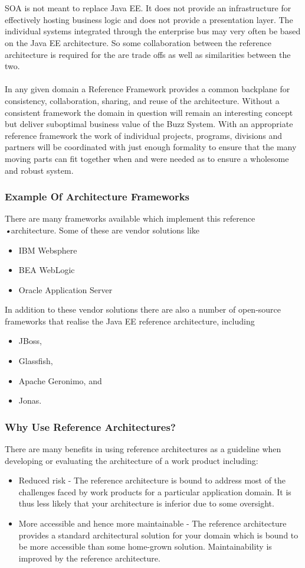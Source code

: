 \documentclass[a4paper]{article}
\begin{document}
\\\\
SOA is not meant to replace Java EE. It does not provide an infrastructure for effectively hosting business logic and does not provide a presentation layer. The individual systems integrated through the enterprise bus may very often be based on the Java EE architecture. So some collaboration between the reference architecture is required for the are trade offs as well as similarities between the two.
\\\\
In any given domain  a Reference Framework  provides a common backplane for consistency, collaboration, sharing, and reuse of the architecture. Without a consistent framework the domain in question will remain an interesting concept but deliver suboptimal business value of the Buzz System. With an appropriate reference framework the work of individual projects, programs, divisions and partners will be coordinated with just enough formality to ensure that the many moving parts can fit together when and were needed as to ensure a wholesome and robust system.


\subsubsection{Example Of Architecture Frameworks}
There are many frameworks available which implement this reference \textsl{\textsl{•}}architecture. Some of these are vendor solutions like
\begin{itemize}
\item IBM Websphere
\item BEA WebLogic
\item Oracle Application Server
\end{itemize} 
In addition to these vendor solutions there are also a number of open-source frameworks that realise the Java EE reference architecture, including
\begin{itemize}
\item JBoss,
\item Glassfish,
\item Apache Geronimo, and
\item Jonas.
\end{itemize}
\subsubsection{Why Use Reference Architectures?}
There are many benefits in using reference architectures as a guideline when developing or evaluating the architecture of a work product including:
\begin{itemize}
\item Reduced risk - The reference architecture is bound to address most of the challenges faced by work products for a particular application domain. It is thus less likely that your architecture is inferior due to some oversight.
\item More accessible and hence more maintainable - The reference architecture provides a standard architectural solution for your domain which is bound to be more accessible than some home-grown solution. Maintainability is improved by the reference architecture.
\end{itemize}
\end{document}

